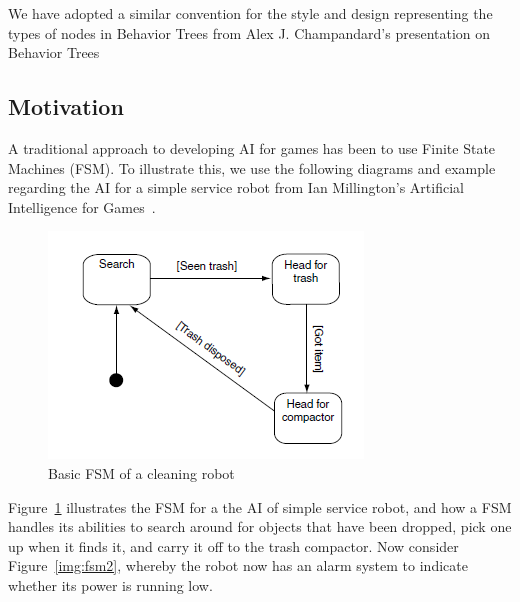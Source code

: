         We have adopted a similar convention for the style and design representing the types of nodes in Behavior Trees from Alex J. Champandard's presentation on Behavior Trees~\cite{btnextgenpart1}
       
        \subsection{Motivation}
        
        A traditional approach to developing AI for games has been to use Finite State Machines (FSM).  To illustrate this, we use the following diagrams and example regarding the AI for a simple service robot from Ian Millington's Artificial Intelligence for Games~\cite{millington}. 
        
        \begin{figure}[htp]
            \begin{center}
            \includegraphics[scale=0.5]{images/fsm1.png}
            \caption{Basic FSM of a cleaning robot}
            \label{img:fsm1}
            \end{center} 
        \end{figure}
        
        Figure~\ref{img:fsm1} illustrates the FSM for a the AI of simple service robot, and how a FSM handles its abilities to  search around for objects that have been dropped, pick one up when it finds it, and carry it off to the trash compactor. Now consider Figure~\ref{img:fsm2}, whereby the robot now has an alarm system to indicate whether its power is running low.

